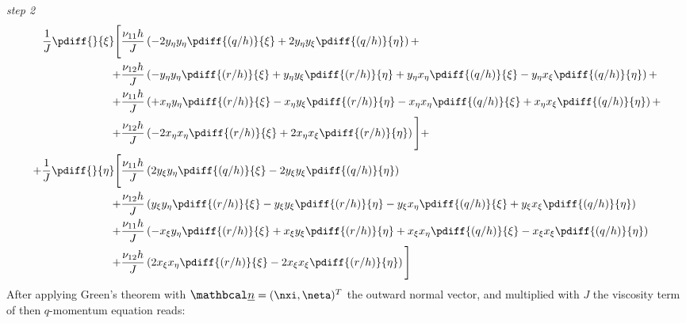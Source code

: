 \textit{step 2}
\begin{align}
\frac{1}{J} \pdiff{}{\xi}\Bigg[ &
\frac{\nu_{11} h}{J} \left(
- 2 y_{\eta}  y_{\eta} \pdiff{(q/h)}{\xi}
+ 2 y_{\eta} y_{\xi} \pdiff{(q/h)}{\eta} \right)
+
\\ + &
\frac{\nu_{12} h}{J} \left(
- y_{\eta}y_{\eta} \pdiff{(r/h)}{\xi}
+ y_{\eta}y_{\xi} \pdiff{(r/h)}{\eta}
+ y_{\eta}x_{\eta}\pdiff{(q/h)}{\xi}
- y_{\eta}x_{\xi}\pdiff{(q/h)}{\eta} \right) +
\\ + &
\frac{\nu_{11} h}{J} \left(
+ x_{\eta}y_{\eta} \pdiff{(r/h)}{\xi}
- x_{\eta}y_{\xi} \pdiff{(r/h)}{\eta}
- x_{\eta}x_{\eta}\pdiff{(q/h)}{\xi}
+ x_{\eta}x_{\xi}\pdiff{(q/h)}{\eta}
\right) +
\\
+ &
\frac{\nu_{12} h}{J}   \left(
- 2 x_{\eta}x_{\eta} \pdiff{(r/h)}{\xi}
+ 2 x_{\eta}x_{\xi} \pdiff{(r/h)}{\eta}
\right)
\Bigg] +
\\
+ \frac{1}{J} \pdiff{}{\eta}\Bigg[ &
\frac{\nu_{11} h}{J} \left(
2 y_{\xi}  y_{\eta} \pdiff{(q/h)}{\xi}
- 2 y_{\xi} y_{\xi} \pdiff{(q/h)}{\eta}
\right)
\\* + &
\frac{\nu_{12} h}{J} \left(
  y_{\xi}y_{\eta} \pdiff{(r/h)}{\xi}
- y_{\xi}y_{\xi} \pdiff{(r/h)}{\eta}
- y_{\xi}x_{\eta}\pdiff{(q/h)}{\xi}
+ y_{\xi}x_{\xi}\pdiff{(q/h)}{\eta}
\right)
\\* + &
\frac{\nu_{11} h}{J} \left(
- x_{\xi}y_{\eta} \pdiff{(r/h)}{\xi}
+ x_{\xi}y_{\xi} \pdiff{(r/h)}{\eta}
+ x_{\xi}x_{\eta}\pdiff{(q/h)}{\xi}
- x_{\xi}x_{\xi}\pdiff{(q/h)}{\eta}
\right)
\\* + &
\frac{\nu_{12} h}{J} \left(
  2 x_{\xi}x_{\eta} \pdiff{(r/h)}{\xi}
- 2 x_{\xi}x_{\xi} \pdiff{(r/h)}{\eta}
\right)
\Bigg]
\label{eq:xi_viscous_term}
\end{align}
%
After applying Green’s theorem with
$\vecn = (\nxi, \neta)^T$ the outward normal vector, and multiplied with $J$  the viscosity term of then $q$-momentum equation reads:
%
